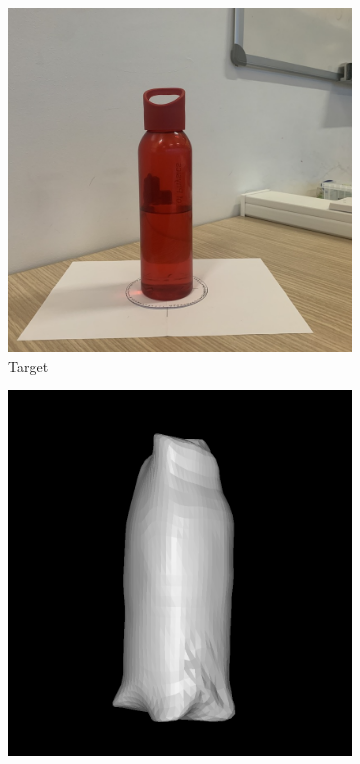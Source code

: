 \documentclass{article}
\begin{document}
\begin{figure}[h!]
  \centering
  \begin{subfigure}{.2\textwidth}
    \centering
    \includegraphics[width=\textwidth]{images/natbottlepng.png}
    \caption{Target}
    \label{results-natbottle-target}
  \end{subfigure}
  \hfill
  \begin{subfigure}{.2\textwidth}
    \centering
    \includegraphics[width=\textwidth]{images/natbottlemesh_a.png}

\end{subfigure}
\end{figure}
\end{document}
